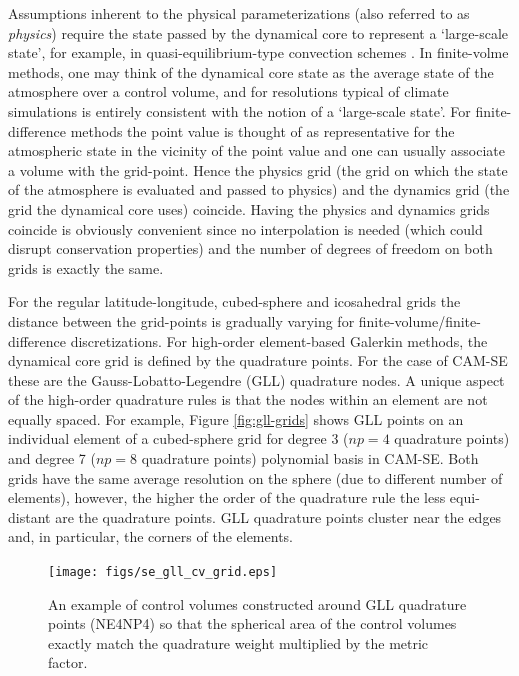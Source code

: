 \documentclass[twocol]{ametsoc}
\begin{document}
Assumptions inherent to the physical parameterizations (also referred to as {\em{physics}}) require the state passed by the dynamical core to represent a `large-scale state', for example, in quasi-equilibrium-type convection schemes \citep{AS1974JAS,PC2008JAS}. In finite-volme methods, one may think of the dynamical core state as the average state of the atmosphere over a control volume, and for resolutions typical of climate simulations is entirely consistent with the notion of a `large-scale state'. For finite-difference methods the point value is thought of as representative for the atmospheric state in the vicinity of the point value and one can usually associate a volume with the grid-point. Hence the physics grid (the grid on which the state of the atmosphere is evaluated and passed to physics) and the dynamics grid (the grid the dynamical core uses) coincide. Having the physics and dynamics grids coincide is obviously convenient since no interpolation is needed (which could disrupt conservation properties) and the number of degrees of freedom on both grids is exactly the same. 

For the regular latitude-longitude, cubed-sphere and icosahedral grids the distance between the grid-points is gradually varying for finite-volume/finite-difference discretizations. For high-order element-based Galerkin methods, the dynamical core grid is defined by the quadrature points. For the case of CAM-SE these are the Gauss-Lobatto-Legendre (GLL) quadrature nodes. A unique aspect of the high-order quadrature rules is that the nodes within an element are not equally spaced. For example, Figure \ref{fig:gll-grids} shows GLL points on an individual element of a cubed-sphere grid for degree 3 ($np=4$ quadrature points) and degree 7 ($np=8$ quadrature points) polynomial basis in CAM-SE. Both grids have the same average resolution on the sphere (due to different number of elements), however, the higher the order of the quadrature rule the less equi-distant are the quadrature points. GLL quadrature points cluster near the edges and, in particular, the corners of the elements.

\begin{figure}[t]
\noindent\texttt{[image: figs/se\_gll\_cv\_grid.eps]}\\
\caption{An example of control volumes constructed around GLL quadrature points (NE4NP4) so that the spherical area of the control volumes exactly match the quadrature weight multiplied by the metric factor.}
\label{fig:cv-grids}
\end{figure}
\end{document}
